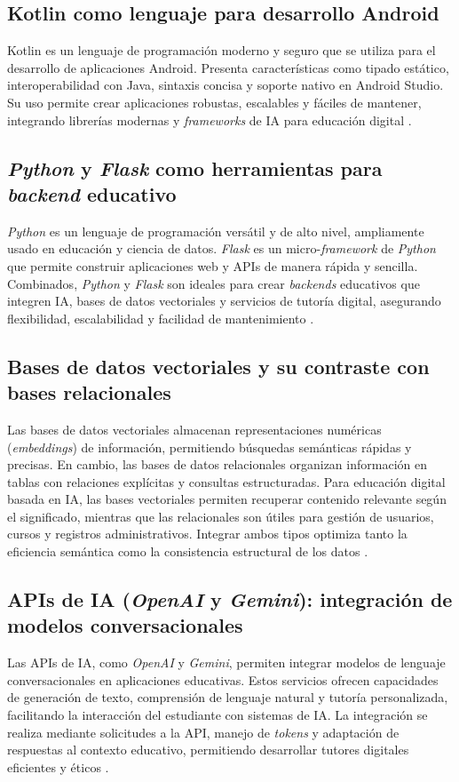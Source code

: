 \subsection{Kotlin como lenguaje para desarrollo Android}
Kotlin es un lenguaje de programación moderno y seguro que se utiliza para el
desarrollo de aplicaciones Android. Presenta características como tipado
estático, interoperabilidad con Java, sintaxis concisa y soporte nativo en
Android Studio. Su uso permite crear aplicaciones robustas, escalables y
fáciles de mantener, integrando librerías modernas y \textit{frameworks} de IA
para educación digital \cite{leiva2018kotlin, fedirchuk2018kotlin}.

\subsection{\textit{Python} y \textit{Flask} como herramientas para \textit{backend} educativo}
\textit{Python} es un lenguaje de programación versátil y de alto nivel,
ampliamente usado en educación y ciencia de datos. \textit{Flask} es un
micro-\textit{framework} de \textit{Python} que permite construir aplicaciones
web y APIs de manera rápida y sencilla. Combinados, \textit{Python} y
\textit{Flask} son ideales para crear \textit{backends} educativos que integren
IA, bases de datos vectoriales y servicios de tutoría digital, asegurando
flexibilidad, escalabilidad y facilidad de mantenimiento
\cite{grinberg2018flask, lutz2013learning}.

\subsection{Bases de datos vectoriales y su contraste con bases relacionales}
Las bases de datos vectoriales almacenan representaciones numéricas
(\textit{embeddings}) de información, permitiendo búsquedas semánticas rápidas
y precisas. En cambio, las bases de datos relacionales organizan información en
tablas con relaciones explícitas y consultas estructuradas. Para educación
digital basada en IA, las bases vectoriales permiten recuperar contenido
relevante según el significado, mientras que las relacionales son útiles para
gestión de usuarios, cursos y registros administrativos. Integrar ambos tipos
optimiza tanto la eficiencia semántica como la consistencia estructural de los
datos \cite{johnson2019billion, chaudhuri1995self}.

\subsection{APIs de IA (\textit{OpenAI} y \textit{Gemini}): integración de modelos conversacionales}
Las APIs de IA, como \textit{OpenAI} y \textit{Gemini}, permiten integrar modelos de lenguaje
conversacionales en aplicaciones educativas. Estos servicios ofrecen
capacidades de generación de texto, comprensión de lenguaje natural y tutoría
personalizada, facilitando la interacción del estudiante con sistemas de IA. La
integración se realiza mediante solicitudes a la API, manejo de \textit{tokens} y
adaptación de respuestas al contexto educativo, permitiendo desarrollar tutores
digitales eficientes y éticos \cite{openai2023api, google2024gemini}.
